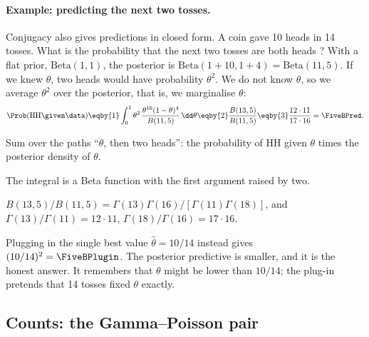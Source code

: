 \paragraph{Example: predicting the next two tosses.}
Conjugacy also gives predictions in closed form. A coin gave 10 heads in 14 tosses. What
is the probability that the next two tosses are both heads ? With a flat prior, $\mathrm{Beta}(1,1)$, the posterior is $\mathrm{Beta}(1+10,
1+4)=\mathrm{Beta}(11,5)$. If we knew $\theta$, two heads would have probability
$\theta^2$. We do not know $\theta$, so we average $\theta^2$ over the posterior, that
is, we marginalise $\theta$:
\begin{align*}
  \Prob(\text{HH}\given\data)
  \eqby{1}\int_0^1\theta^2\,\frac{\theta^{10}(1-\theta)^{4}}{B(11,5)}\,\dd\theta
  \eqby{2}\frac{B(13,5)}{B(11,5)}
  \eqby{3}\frac{12\cdot11}{17\cdot16}
  =\FiveBPred .
\end{align*}
\begin{explain}
  \item Sum over the paths ``$\theta$, then two heads'': the probability of HH given
        $\theta$ times the posterior density of $\theta$.
  \item The integral is a Beta function with the first argument raised by two.
  \item $B(13,5)/B(11,5)=\Gamma(13)\Gamma(16)/[\Gamma(11)\Gamma(18)]$, and
        $\Gamma(13)/\Gamma(11)=12\cdot11$, $\Gamma(18)/\Gamma(16)=17\cdot16$.
\end{explain}
Plugging in the single best value $\hat\theta=10/14$ instead gives
$(10/14)^2=\FiveBPlugin$. The posterior predictive is smaller, and it is the honest
answer. It remembers that $\theta$ might be lower than $10/14$; the plug-in pretends that
14 tosses fixed $\theta$ exactly.

\subsection{Counts: the Gamma--Poisson pair}

